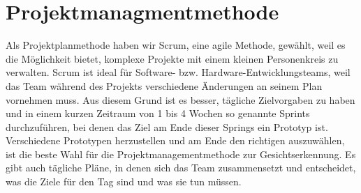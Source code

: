 \section{Projektmanagmentmethode}
Als Projektplanmethode haben wir Scrum, eine agile Methode, gewählt, weil es die Möglichkeit bietet, komplexe Projekte mit einem kleinen Personenkreis zu verwalten. Scrum ist ideal für Software- bzw. Hardware-Entwicklungsteams, weil das Team während des Projekts verschiedene Änderungen an seinem Plan vornehmen muss. Aus diesem Grund ist es besser, tägliche Zielvorgaben zu haben und in einem kurzen Zeitraum von 1 bis 4 Wochen so genannte Sprints durchzuführen, bei denen das Ziel am Ende dieser Springs ein Prototyp ist. Verschiedene Prototypen herzustellen und am Ende den richtigen auszuwählen, ist die beste Wahl für die Projektmanagementmethode zur Gesichtserkennung. Es gibt auch tägliche Pläne, in denen sich das Team zusammensetzt und entscheidet, was die Ziele für den Tag sind und was sie tun müssen.\cite{scrum}